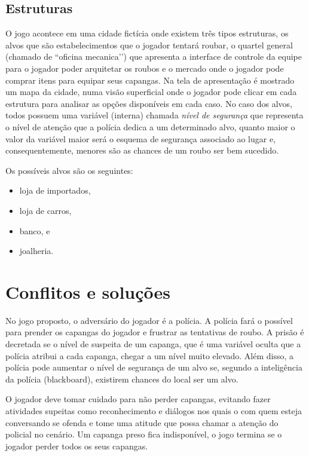 \subsection{Estruturas}
O jogo acontece em uma cidade fictícia onde existem três tipos estruturas, os alvos que são estabelecimentos que o jogador tentará roubar, o quartel general (chamado de ``oficina mecanica’’) que apresenta a interface de controle da equipe para o jogador poder arquitetar os roubos e o mercado onde o jogador pode comprar itens para equipar seus capangas.
Na tela de apresentação é mostrado um mapa da cidade, numa visão superficial onde o jogador pode clicar em cada estrutura para analisar as opções disponíveis em cada caso.
No caso dos alvos, todos possuem uma variável (interna) chamada \emph{nível de segurança} que representa o nível de atenção que a polícia dedica a um determinado alvo, quanto maior o valor da variável maior será o esquema de segurança associado ao lugar e, consequentemente, menores são as chances de um roubo ser bem sucedido.

Os possíveis alvos são os seguintes:
\begin{itemize}
\item loja de importados,
\item loja de carros,
\item banco, e
\item joalheria.
\end{itemize}


\section{Conflitos e soluções}
No jogo proposto, o adversário do jogador é a polícia. A polícia fará o possível para prender os capangas do jogador e frustrar as tentativas de roubo. A prisão é decretada se o nível de suspeita de um capanga, que é uma variável oculta que a polícia atribui a cada capanga, chegar a um nível muito elevado. Além disso, a polícia pode aumentar o nível de segurança de um alvo se, segundo a inteligência da polícia (blackboard), existirem chances do local ser um alvo.

O jogador deve tomar cuidado para não perder capangas, evitando fazer atividades supeitas como reconhecimento e diálogos nos quais o \npc{} com quem esteja conversando se ofenda e tome uma atitude que possa chamar a atenção do policial no cenário.
Um capanga preso fica indisponível, o jogo termina se o jogador perder todos os seus capangas.

